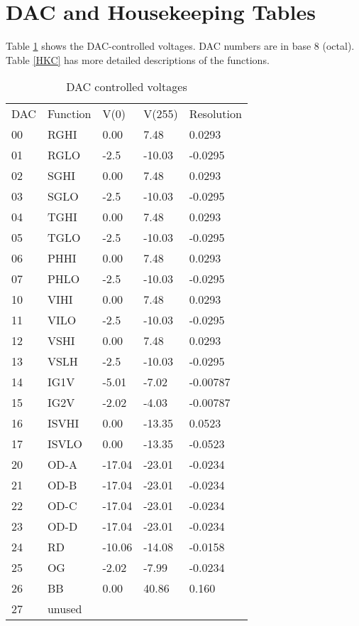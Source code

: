 \section{DAC and Housekeeping Tables}

Table \ref{DACV} shows the DAC-controlled voltages. DAC numbers are in base 8 (octal). Table \ref{HKC} has more detailed descriptions of the functions.

\begin{table}[h]
\centering
\begin{tabular}{|l|l|l|l|l|}
\hline
DAC & Function & V(0) & V(255) & Resolution \\
00 & RGHI & 0.00 & 7.48 & 0.0293 \\
01 & RGLO & -2.5 & -10.03 & -0.0295 \\
02 & SGHI & 0.00 & 7.48 & 0.0293 \\
03 & SGLO & -2.5 & -10.03 & -0.0295 \\
04 & TGHI & 0.00 & 7.48 & 0.0293 \\
05 & TGLO & -2.5 & -10.03 & -0.0295 \\
06 & PHHI & 0.00 & 7.48 & 0.0293 \\
07 & PHLO & -2.5 & -10.03 & -0.0295 \\
10 & VIHI & 0.00 & 7.48 & 0.0293 \\
11 & VILO & -2.5 & -10.03 & -0.0295 \\
12 & VSHI & 0.00 & 7.48 & 0.0293 \\
13 & VSLH & -2.5 & -10.03 & -0.0295 \\
14 & IG1V & -5.01 & -7.02 & -0.00787 \\
15 & IG2V & -2.02 & -4.03 & -0.00787 \\
16 & ISVHI & 0.00 & -13.35 & 0.0523 \\
17 & ISVLO & 0.00 & -13.35 & -0.0523 \\
20 & OD-A & -17.04 & -23.01 & -0.0234 \\
21 & OD-B & -17.04 & -23.01 & -0.0234 \\
22 & OD-C & -17.04 & -23.01 & -0.0234 \\
23 & OD-D & -17.04 & -23.01 & -0.0234 \\
24 & RD & -10.06 & -14.08 & -0.0158 \\
25 & OG & -2.02 & -7.99 & -0.0234 \\
26 & BB & 0.00 & 40.86 & 0.160 \\
27 & unused & & & \\
\hline
\end{tabular}
\caption{DAC controlled voltages}
\label{DACV}
\end{table}

